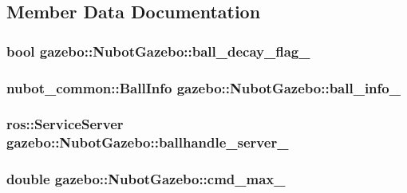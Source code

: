 \subsection{Member Data Documentation}
\hypertarget{classgazebo_1_1NubotGazebo_a51c8eaa9e931b22700f6c000e413bfa2}{
\subsubsection[{ball\-\_\-decay\-\_\-flag\-\_\-}]{\setlength{\rightskip}{0pt plus 5cm}bool gazebo\-::\-Nubot\-Gazebo\-::ball\-\_\-decay\-\_\-flag\-\_\-\hspace{0.3cm}{\ttfamily [private]}}}\label{classgazebo_1_1NubotGazebo_a51c8eaa9e931b22700f6c000e413bfa2}
\hypertarget{classgazebo_1_1NubotGazebo_a69c9083b620e0914c1e05c491a72dee1}{
\subsubsection[{ball\-\_\-info\-\_\-}]{\setlength{\rightskip}{0pt plus 5cm}nubot\-\_\-common\-::\-Ball\-Info gazebo\-::\-Nubot\-Gazebo\-::ball\-\_\-info\-\_\-\hspace{0.3cm}{\ttfamily [private]}}}\label{classgazebo_1_1NubotGazebo_a69c9083b620e0914c1e05c491a72dee1}
\hypertarget{classgazebo_1_1NubotGazebo_af8abc682c8dc7cad7d29d131901aec05}{
\subsubsection[{ballhandle\-\_\-server\-\_\-}]{\setlength{\rightskip}{0pt plus 5cm}ros\-::\-Service\-Server gazebo\-::\-Nubot\-Gazebo\-::ballhandle\-\_\-server\-\_\-\hspace{0.3cm}{\ttfamily [private]}}}\label{classgazebo_1_1NubotGazebo_af8abc682c8dc7cad7d29d131901aec05}
\hypertarget{classgazebo_1_1NubotGazebo_a6b6ab10ac24ec1483797885f5d1b9110}{
\subsubsection[{cmd\-\_\-max\-\_\-}]{\setlength{\rightskip}{0pt plus 5cm}double gazebo\-::\-Nubot\-Gazebo\-::cmd\-\_\-max\-\_\-\hspace{0.3cm}{\ttfamily [private]}}}\label{classgazebo_1_1NubotGazebo_a6b6ab10ac24ec1483797885f5d1b9110}
